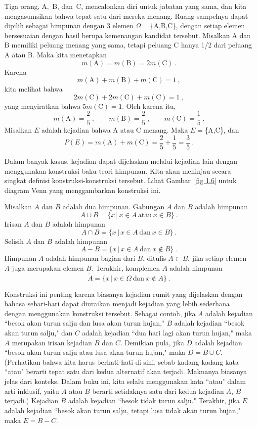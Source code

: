 \begin{example}\label{exam 1.7}
Tiga orang, A,~B, dan~C, mencalonkan diri untuk jabatan yang sama, dan kita mengasumsikan
bahwa
tepat satu dari mereka menang.  Ruang sampelnya dapat dipilih sebagai
himpunan dengan 3 elemen
$\Omega = $\{A,B,C\}, dengan setiap elemen bersesuaian dengan hasil berupa kemenangan
kandidat tersebut.  Misalkan A dan B memiliki peluang menang yang sama,
tetapi peluang C hanya 1/2 dari peluang A atau B.  Maka kita menetapkan
$$
m(\mbox{A}) = m(\mbox{B}) = 2m(\mbox{C})\ .
$$
Karena
$$
m(\mbox{A}) + m(\mbox{B}) + m(\mbox{C}) = 1\ ,
$$
kita melihat bahwa
$$
2m(\mbox{C}) + 2m(\mbox{C}) + m(\mbox{C}) = 1\ ,
$$
yang menyiratkan bahwa $5m(\mbox{C}) = 1$.  Oleh karena itu,
$$
m(\mbox{A}) = \frac25\ , \qquad m(\mbox{B}) = \frac25\ , \qquad m(\mbox{C}) =
\frac15\ .
$$
Misalkan $E$ adalah kejadian bahwa A atau C menang.  Maka $E = $\{A,C\}, dan
$$
P(E) = m(\mbox{A}) + m(\mbox{C}) = \frac25 + \frac15 = \frac35\ .
$$
\end{example}
\par
Dalam banyak kasus, kejadian dapat dijelaskan melalui kejadian lain dengan menggunakan
konstruksi baku teori himpunan.  Kita akan meninjau secara singkat definisi
konstruksi-konstruksi tersebut.  Lihat Gambar~\ref{fig 1.6} untuk diagram Venn
yang menggambarkan konstruksi ini. 
\par
Misalkan $A$ dan $B$ adalah dua himpunan.  Gabungan $A$ dan $B$ adalah himpunan
$$A \cup B = \{x\,|\, x \in A\ \mbox{atau}\ x \in B\}\ .$$
Irisan $A$ dan $B$ adalah himpunan
$$A \cap B = \{x\,|\, x \in A\ \mbox{dan}\ x \in B\}\ .$$
Selisih $A$ dan $B$ adalah himpunan
$$A - B = \{x\,|\, x \in A\ \mbox{dan}\ x \not \in B\}\ .$$
Himpunan $A$ adalah himpunan bagian dari $B$, ditulis 
$A \subset B$, jika setiap elemen $A$ juga merupakan elemen $B$.  Terakhir,
komplemen $A$ adalah himpunan
$$\tilde A = \{x\,|\, x \in \Omega\ \mbox{dan}\ x \not \in A\}\ .$$
\par
Konstruksi ini penting karena biasanya
kejadian rumit yang dijelaskan dengan bahasa sehari-hari dapat diuraikan menjadi kejadian yang lebih sederhana
dengan menggunakan konstruksi tersebut.  Sebagai contoh, jika $A$ adalah kejadian ``besok akan turun salju
dan lusa akan
turun hujan," $B$ adalah kejadian ``besok akan turun salju," dan
$C$ adalah
kejadian ``dua hari lagi akan turun hujan," maka $A$ merupakan irisan
kejadian
$B$ dan $C$.  Demikian pula, jika $D$ adalah kejadian ``besok akan turun salju atau
lusa akan turun hujan," maka $D = B \cup C$.  (Perhatikan bahwa kita harus
berhati-hati di sini,
sebab kadang-kadang kata ``atau" berarti tepat satu dari kedua
alternatif
akan terjadi.  Maknanya biasanya jelas dari konteks.  Dalam buku ini, kita
selalu menggunakan
kata ``atau" dalam arti inklusif, yaitu $A$ atau $B$ berarti setidaknya
satu dari kedua
kejadian $A$, $B$ terjadi.)  Kejadian $\tilde B$ adalah kejadian ``besok
tidak turun
salju."  Terakhir, jika $E$ adalah kejadian ``besok akan turun salju, tetapi lusa
tidak akan turun hujan," maka $E = B - C$. 

